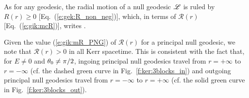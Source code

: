 As for any geodesic, the radial motion of a null geodesic $\mathscr{L}$ is ruled by
$R(r)\geq 0$ [Eq.~(\ref{e:gek:R_non_neg})], which, in terms of $\mathcal{R}(r)$
[Eq.~(\ref{e:gik:mcR})],
writes
\be \label{e:mcR_non_neg}
    .
\ee

\begin{example}
Given the value (\ref{e:gik:mR_PNG}) of $\mathcal{R}(r)$ for
a principal null geodesic, we note that
$\mathcal{R}(r) > 0$ in all Kerr spacetime. This is
consistent with the fact that, for $E\neq 0$ and $\theta_0\neq\pi/2$, ingoing principal null geodesics
travel from $r=+\infty$ to $r=-\infty$ (cf. the dashed green curve
in Fig.~\ref{f:ker:3blocks_in}) and outgoing principal null geodesics
travel from $r=-\infty$ to $r=+\infty$ (cf. the solid green curve
in Fig.~\ref{f:ker:3blocks_out}).
\end{example}

